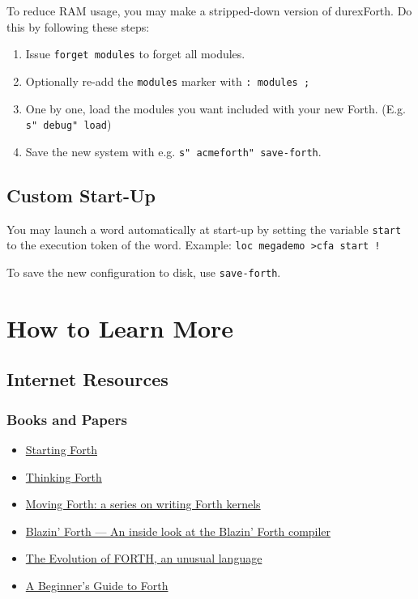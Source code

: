 To reduce RAM usage, you may make a stripped-down version of durexForth. Do this by following these steps:

\begin{enumerate}
\item Issue \texttt{forget modules} to forget all modules.
\item Optionally re-add the \texttt{modules} marker with \texttt{: modules ;}
\item One by one, load the modules you want included with your new Forth. (E.g. \texttt{s" debug" load})
\item Save the new system with e.g. \texttt{s" acmeforth" save-forth}.
\end{enumerate}

\subsection{Custom Start-Up}

You may launch a word automatically at start-up by setting the variable \texttt{start} to the execution token of the word.  Example: \texttt{loc megademo >cfa start !}

To save the new configuration to disk, use \texttt{save-forth}.

\section{How to Learn More}

\subsection{Internet Resources}

\subsubsection{Books and Papers}

\begin{itemize}
\item \href{http://www.forth.com/starting-forth/}{Starting Forth}
\item \href{http://thinking-forth.sourceforge.net/}{Thinking Forth}
\item \href{http://www.bradrodriguez.com/papers/}{Moving Forth: a series on writing Forth kernels}
\item \href{http://www.csbruce.com/~csbruce/cbm/transactor/v7/i5/p058.html}{Blazin' Forth --- An inside look at the Blazin' Forth compiler}
\item \href{http://dobbscodetalk.com/index.php?option=com_myblog&show=In-this-1980-article-from-Byte-Charles-Moore-recounts-the-creation-of-Forth..html&Itemid=29}{The Evolution of FORTH, an unusual language}
\item \href{http://galileo.phys.virginia.edu/classes/551.jvn.fall01/primer.htm}{A Beginner's Guide to Forth}
\end{itemize}

